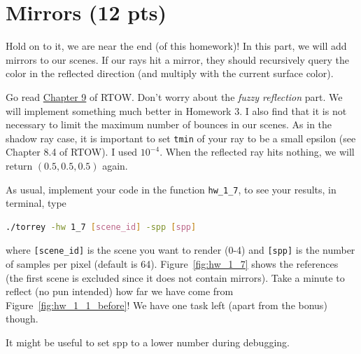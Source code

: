 \section{Mirrors (12 pts)}
Hold on to it, we are near the end (of this homework)! In this part, we will add mirrors to our scenes. If our rays hit a mirror, they should recursively query the color in the reflected direction (and multiply with the current surface color).

Go read \href{https://raytracing.github.io/books/RayTracingInOneWeekend.html#metal}{Chapter 9} of RTOW. Don't worry about the \emph{fuzzy reflection} part. We will implement something much better in Homework 3. I also find that it is not necessary to limit the maximum number of bounces in our scenes. As in the shadow ray case, it is important to set \lstinline{tmin} of your ray to be a small epsilon (see Chapter 8.4 of RTOW). I used $10^{-4}$. When the reflected ray hits nothing, we will return $(0.5, 0.5, 0.5)$ again.

As usual, implement your code in the function \lstinline{hw_1_7}, to see your results, in terminal, type
\begin{lstlisting}[language=bash]
  ./torrey -hw 1_7 [scene_id] -spp [spp]
\end{lstlisting}
where \lstinline{[scene_id]} is the scene you want to render (0-4) and \lstinline{[spp]} is the number of samples per pixel (default is 64). Figure~\ref{fig:hw_1_7} shows the references (the first scene is excluded since it does not contain mirrors). Take a minute to reflect (no pun intended) how far we have come from Figure~\ref{fig:hw_1_1_before}! We have one task left (apart from the bonus) though.

It might be useful to set spp to a lower number during debugging.

